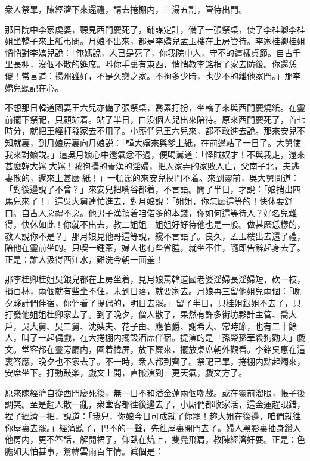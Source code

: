 衆人祭畢，陳經濟下來還禮，請去捲棚内，三湯五割，管待出門。

那日院中李家虔婆，聽見西門慶死了，鋪謀定計，備了一張祭桌，使了李桂卿李桂姐坐轎子來上紙弔問。月娘不出來，都是李嬌兒孟玉樓在上房管待。李家桂卿桂姐悄悄對李嬌兒說：「俺媽說，人已是死了，你我院中人，守不的這樣貞節。自古千里長棚，沒個不散的筵席。呌你手裏有東西，悄悄教李銘捎了家去防後。你還恁儍！常言道：揚州雖好，不是久戀之家。不拘多少時，也少不的離他家門。」那李嬌兒聽記在心。

不想那日韓道國妻王六兒亦備了張祭桌，喬素打扮，坐轎子來與西門慶燒紙。在靈前擺下祭祀，只顧站着。站了半日，白没個人兒出來陪待。原來西門慶死了，首七時分，就把王經打發家去不用了。小廝們見王六兒來，都不敢進去說。那來安兒不知就裏，到月娘房裏向月娘説：「韓大嬸來與爹上紙，在前邊站了一日了。大舅使我來對娘説。」這吳月娘心中還氣忿不過，便喝罵道：「怪賊奴才！不與我走，還來甚麽韓大嬸𣭈大嬸！賊狗攮的養漢的淫婦，把人家弄的家敗人亡，父南子北，夫逃妻散的，還來上甚麽𣭈紙！」一頓駡的來安兒摸門不着。來到靈前，吳大舅問道：「對後邊說了不曾？」來安兒把嘴谷都着，不言語。問了半日，才說：「娘捎出四馬兒來了！」這吳大舅連忙進去，對月娘說：「姐姐，你怎麽這等的！快休要舒口。自古人惡禮不惡。他男子漢領着咱偌多的本錢，你如何這等待人？好名兒難得，快休如此！你就不出去，教二姐姐三姐姐好好待他也是一般。做甚麽恁樣的，教人說你不是？」那月娘見他哥這等說，纔不言語了。良久，孟玉樓出去還了禮，陪他在靈前坐的。只喫一鍾茶，婦人也有些省䐩，就坐不住，隨即告辭起身去了。正是：誰人汲得西江水，難洗今朝一面羞！

那李桂卿桂姐吳銀兒都在上房坐着，見月娘罵韓道國老婆淫婦長淫婦短，砍一枝，損百林，兩個就有些坐不住，未到日落，就要家去。月娘再三留他姐兒兩個：「晚夕夥計們伴宿，你們看了提偶的，明日去罷。」留了半日，只桂姐銀姐不去了，只打發他姐姐桂卿家去了。到了晚夕，僧人散了，果然有許多街坊夥計主管、喬大戶，吳大舅、吳二舅、沈姨夫、花子由、應伯爵、謝希大、常時節，也有二十餘人，叫了一起偶戲，在大捲棚内擺設酒席伴宿。提演的是「孫榮孫華殺狗勸夫」戯文。堂客都在靈旁廳内，圍着幃屏，放下簾來，擺放桌席朝外觀看。李銘吳惠在這裏答應，晚夕也不家去了。不一時，衆人都到齊了。祭祀已畢，捲棚内點起燭來，安席坐下。打動鼓楽，戯文上開，直搬演到三更天氣，戯文方了。

原來陳經濟自從西門慶死後，無一日不和潘金蓮兩個嘲戲。或在靈前溜眼，帳子後調笑。至是趕人散一亂，衆堂客都徃後邊去了，小廝們都收家活，這金蓮趕眼錯，捏了經濟一把，說道：「我兒，你娘今日可成就了你罷！趂大姐在後邊，咱們就徃你屋裏去罷。」經濟聽了，巴不的一聲，先徃屋裏開門去了。婦人黑影裏抽身鑽入他房内，更不答話，解開裙子，仰臥在炕上，雙鳧飛肩，教陳經濟奸耍。正是：色膽如天怕甚事，鴛幃雲雨百年情。眞個是：

